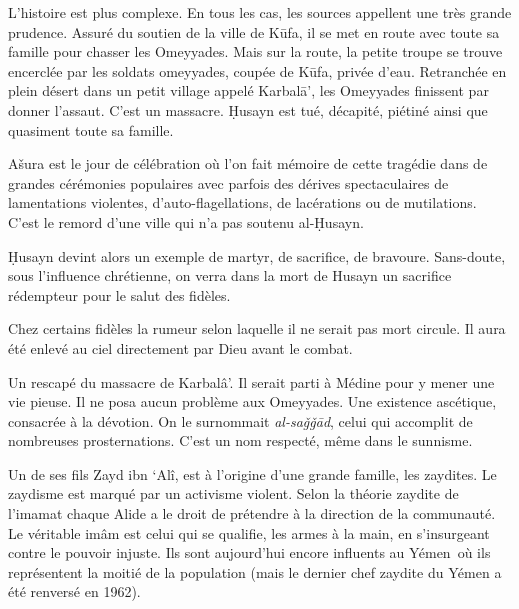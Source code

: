 L'histoire est plus complexe. En tous les cas, les sources appellent une
très grande prudence. Assuré du soutien de la ville de Kūfa, il se met
en route avec toute sa famille pour chasser les Omeyyades. Mais sur la
route, la petite troupe se trouve encerclée par les soldats omeyyades,
coupée de Kūfa, privée d'eau. Retranchée en plein désert dans un petit
village appelé Karbalā', les Omeyyades finissent par donner l'assaut.
C'est un massacre. Ḥusayn est tué, décapité, piétiné ainsi que quasiment
toute sa famille.

Ašura est le jour de célébration où l'on fait mémoire de cette tragédie
dans de grandes cérémonies populaires avec parfois des dérives
spectaculaires de lamentations violentes, d'auto-flagellations, de
lacérations ou de mutilations. C'est le remord d'une ville qui n'a pas
soutenu al-Ḥusayn.

Ḥusayn devint alors un exemple de martyr, de sacrifice, de bravoure.
Sans-doute, sous l'influence chrétienne, on verra dans la mort de Husayn
un sacrifice rédempteur pour le salut des fidèles.

Chez certains fidèles la rumeur selon laquelle il ne serait pas mort
circule. Il aura été enlevé au ciel directement par Dieu avant le
combat.





Un rescapé du massacre de Karbalâ'. Il serait parti à Médine pour y
mener une vie pieuse. Il ne posa aucun problème aux Omeyyades. Une
existence ascétique, consacrée à la dévotion. On le surnommait
\emph{al-saǧǧād}, celui qui accomplit de nombreuses prosternations.
C'est un nom respecté, même dans le sunnisme.

Un de ses fils Zayd ibn `Alî, est à l'origine d'une grande famille, les
zaydites. Le zaydisme est marqué par un activisme violent. Selon la
théorie zaydite de l'imamat chaque Alide a le droit de prétendre à la
direction de la communauté. Le véritable imâm est celui qui se qualifie,
les armes à la main, en s'insurgeant contre le pouvoir injuste. Ils sont
aujourd'hui encore influents au Yémen~où ils représentent la moitié de
la population (mais le dernier chef zaydite du Yémen a été renversé en
1962).

